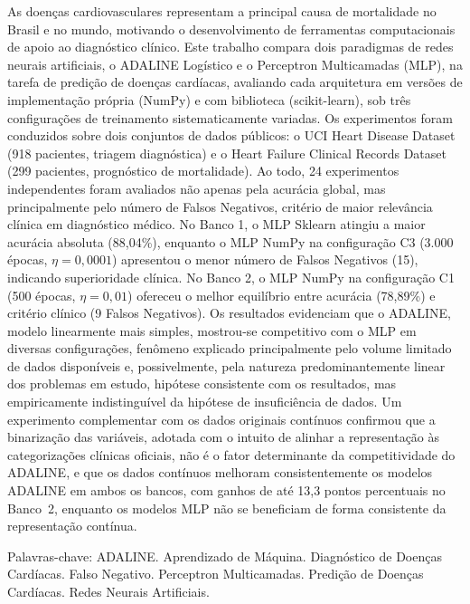 \begin{resumo}
As doenças cardiovasculares representam a principal causa de mortalidade no Brasil e no mundo, motivando o desenvolvimento de ferramentas computacionais de apoio ao diagnóstico clínico. Este trabalho compara dois paradigmas de redes neurais artificiais, o ADALINE Logístico e o Perceptron Multicamadas (MLP), na tarefa de predição de doenças cardíacas, avaliando cada arquitetura em versões de implementação própria (NumPy) e com biblioteca (scikit-learn), sob três configurações de treinamento sistematicamente variadas. Os experimentos foram conduzidos sobre dois conjuntos de dados públicos: o UCI Heart Disease Dataset (918 pacientes, triagem diagnóstica) e o Heart Failure Clinical Records Dataset (299 pacientes, prognóstico de mortalidade). Ao todo, 24 experimentos independentes foram avaliados não apenas pela acurácia global, mas principalmente pelo número de Falsos Negativos, critério de maior relevância clínica em diagnóstico médico. No Banco 1, o MLP Sklearn atingiu a maior acurácia absoluta (88,04\%), enquanto o MLP NumPy na configuração C3 (3.000 épocas, $\eta = 0{,}0001$) apresentou o menor número de Falsos Negativos (15), indicando superioridade clínica. No Banco 2, o MLP NumPy na configuração C1 (500 épocas, $\eta = 0{,}01$) ofereceu o melhor equilíbrio entre acurácia (78,89\%) e critério clínico (9 Falsos Negativos). Os resultados evidenciam que o ADALINE, modelo linearmente mais simples, mostrou-se competitivo com o MLP em diversas configurações, fenômeno explicado principalmente pelo volume limitado de dados disponíveis e, possivelmente, pela natureza predominantemente linear dos problemas em estudo, hipótese consistente com os resultados, mas empiricamente indistinguível da hipótese de insuficiência de dados. Um experimento complementar com os dados originais contínuos confirmou que a binarização das variáveis, adotada com o intuito de alinhar a representação às categorizações clínicas oficiais, não é o fator determinante da competitividade do ADALINE, e que os dados contínuos melhoram consistentemente os modelos ADALINE em ambos os bancos, com ganhos de até 13,3 pontos percentuais no Banco~2, enquanto os modelos MLP não se beneficiam de forma consistente da representação contínua.

\noindent Palavras-chave: ADALINE. Aprendizado de Máquina. Diagnóstico de Doenças Cardíacas. Falso Negativo. Perceptron Multicamadas. Predição de Doenças Cardíacas. Redes Neurais Artificiais.
\end{resumo}
